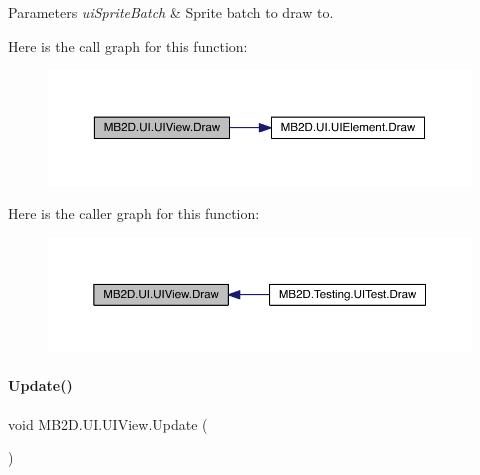\begin{DoxyParams}{Parameters}
{\em ui\+Sprite\+Batch} & Sprite batch to draw to.\\
\hline
\end{DoxyParams}
Here is the call graph for this function\+:
\nopagebreak
\begin{figure}[H]
\begin{center}
\leavevmode
\includegraphics[width=350pt]{class_m_b2_d_1_1_u_i_1_1_u_i_view_a1f1acf013f17aa0738ff2d9b0516126e_cgraph}
\end{center}
\end{figure}
Here is the caller graph for this function\+:
\nopagebreak
\begin{figure}[H]
\begin{center}
\leavevmode
\includegraphics[width=350pt]{class_m_b2_d_1_1_u_i_1_1_u_i_view_a1f1acf013f17aa0738ff2d9b0516126e_icgraph}
\end{center}
\end{figure}
\hypertarget{class_m_b2_d_1_1_u_i_1_1_u_i_view_a5628b6cd853a0f419eb8ac62958f62bb}{}\label{class_m_b2_d_1_1_u_i_1_1_u_i_view_a5628b6cd853a0f419eb8ac62958f62bb} 
\paragraph{\texorpdfstring{Update()}{Update()}}
{\footnotesize\ttfamily void M\+B2\+D.\+U\+I.\+U\+I\+View.\+Update (\begin{DoxyParamCaption}{ }\end{DoxyParamCaption})\hspace{0.3cm}{\ttfamily [inline]}}




